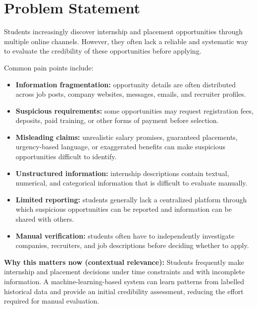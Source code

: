 \documentclass[11pt,a4paper]{article}
\begin{document}
\section{Problem Statement}

Students increasingly discover internship and placement opportunities through
multiple online channels. However, they often lack a reliable and systematic
way to evaluate the credibility of these opportunities before applying.

Common pain points include:
\begin{itemize}[leftmargin=0.7cm]

    \item \textbf{Information fragmentation:} opportunity details are often
    distributed across job posts, company websites, messages, emails, and
    recruiter profiles.

    \item \textbf{Suspicious requirements:} some opportunities may request
    registration fees, deposits, paid training, or other forms of payment
    before selection.

    \item \textbf{Misleading claims:} unrealistic salary promises, guaranteed
    placements, urgency-based language, or exaggerated benefits can make
    suspicious opportunities difficult to identify.

    \item \textbf{Unstructured information:} internship descriptions contain
    textual, numerical, and categorical information that is difficult to
    evaluate manually.

    \item \textbf{Limited reporting:} students generally lack a centralized
    platform through which suspicious opportunities can be reported and
    information can be shared with others.

    \item \textbf{Manual verification:} students often have to independently
    investigate companies, recruiters, and job descriptions before deciding
    whether to apply.
\end{itemize}

\textbf{Why this matters now (contextual relevance):}
Students frequently make internship and placement decisions under time
constraints and with incomplete information. A machine-learning-based system
can learn patterns from labelled historical data and provide an initial
credibility assessment, reducing the effort required for manual evaluation.
\end{document}
